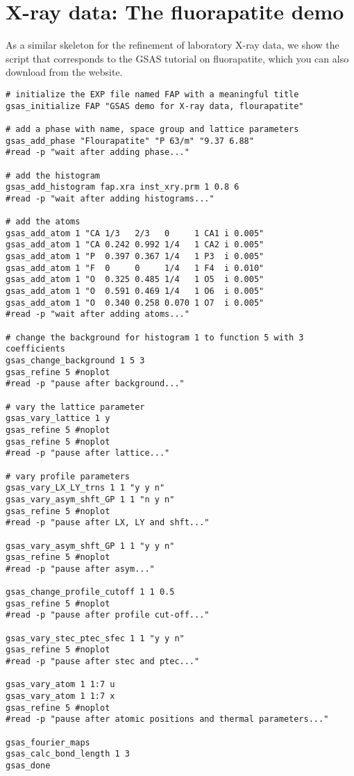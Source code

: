 \section{X-ray data: The fluorapatite demo}
As a similar skeleton for the refinement of laboratory X-ray data, we show the script that corresponds to the GSAS tutorial on fluorapatite, which you can also download from the \gl\hspace{0.5em} website.
\begin{verbatim}
# initialize the EXP file named FAP with a meaningful title
gsas_initialize FAP "GSAS demo for X-ray data, flourapatite"

# add a phase with name, space group and lattice parameters
gsas_add_phase "Flourapatite" "P 63/m" "9.37 6.88"
#read -p "wait after adding phase..."

# add the histogram
gsas_add_histogram fap.xra inst_xry.prm 1 0.8 6
#read -p "wait after adding histograms..."

# add the atoms
gsas_add_atom 1 "CA 1/3   2/3   0     1 CA1 i 0.005"
gsas_add_atom 1 "CA 0.242 0.992 1/4   1 CA2 i 0.005"
gsas_add_atom 1 "P  0.397 0.367 1/4   1 P3  i 0.005"
gsas_add_atom 1 "F  0     0     1/4   1 F4  i 0.010"
gsas_add_atom 1 "O  0.325 0.485 1/4   1 O5  i 0.005"
gsas_add_atom 1 "O  0.591 0.469 1/4   1 O6  i 0.005"
gsas_add_atom 1 "O  0.340 0.258 0.070 1 O7  i 0.005"
#read -p "wait after adding atoms..."

# change the background for histogram 1 to function 5 with 3 coefficients
gsas_change_background 1 5 3
gsas_refine 5 #noplot
#read -p "pause after background..."

# vary the lattice parameter
gsas_vary_lattice 1 y
gsas_refine 5 #noplot
gsas_refine 5 #noplot
#read -p "pause after lattice..."

# vary profile parameters
gsas_vary_LX_LY_trns 1 1 "y y n"
gsas_vary_asym_shft_GP 1 1 "n y n"
gsas_refine 5 #noplot
#read -p "pause after LX, LY and shft..."

gsas_vary_asym_shft_GP 1 1 "y y n"
gsas_refine 5 #noplot
#read -p "pause after asym..."

gsas_change_profile_cutoff 1 1 0.5
gsas_refine 5 #noplot
#read -p "pause after profile cut-off..."

gsas_vary_stec_ptec_sfec 1 1 "y y n"
gsas_refine 5 #noplot
#read -p "pause after stec and ptec..."

gsas_vary_atom 1 1:7 u 
gsas_vary_atom 1 1:7 x 
gsas_refine 5 #noplot
#read -p "pause after atomic positions and thermal parameters..."

gsas_fourier_maps
gsas_calc_bond_length 1 3
gsas_done
\end{verbatim}
